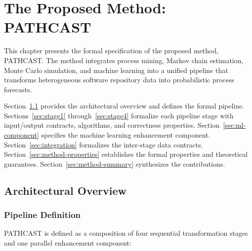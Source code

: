 
\chapter{The Proposed Method: PATHCAST}
\label{ch:method}

This chapter presents the formal specification of the proposed method,
PATHCAST. The method integrates process mining, Markov chain estimation,
Monte Carlo simulation, and machine learning into a unified pipeline that
transforms heterogeneous software repository data into probabilistic
process forecasts.

Section~\ref{sec:method-overview} provides the architectural overview and
defines the formal pipeline. Sections~\ref{sec:stage1}
through~\ref{sec:stage4} formalize each pipeline stage with input/output
contracts, algorithms, and correctness properties.
Section~\ref{sec:ml-component} specifies the machine learning enhancement
component. Section~\ref{sec:integration} formalizes the inter-stage data
contracts. Section~\ref{sec:method-properties} establishes the formal
properties and theoretical guarantees.
Section~\ref{sec:method-summary} synthesizes the contributions.


\section{Architectural Overview}
\label{sec:method-overview}

\subsection{Pipeline Definition}
\label{sec:pipeline-def}

PATHCAST is defined as a composition of four sequential transformation
stages and one parallel enhancement component:

